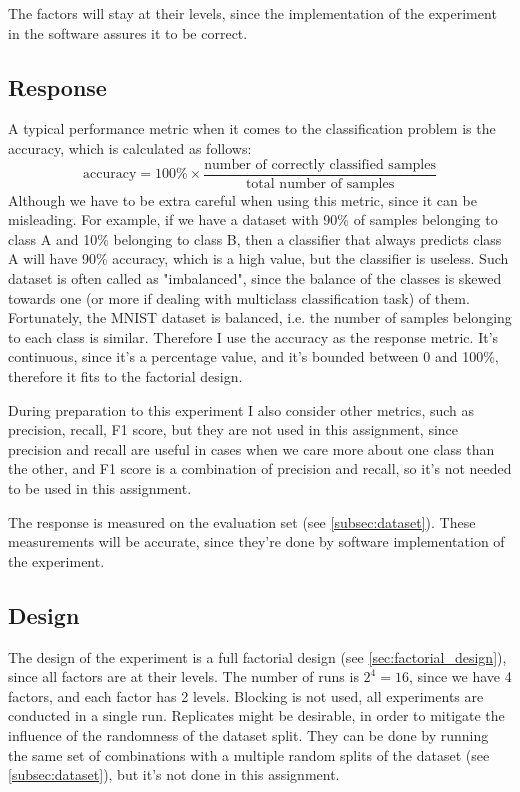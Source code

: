 \documentclass{article}
\begin{document}
The factors will stay at their levels, since the implementation of the experiment in the software assures it to be correct.

\subsection{Response}
A typical performance metric when it comes to the classification problem is the accuracy, which is calculated as follows:
\begin{equation}
    \text{accuracy} = 100\%\times\frac{\text{number of correctly classified samples}}{\text{total number of samples}}
\end{equation}
Although we have to be extra careful when using this metric, since it can be misleading. For example, if we have a dataset with 90\% of samples belonging to class A and 10\% belonging to class B, then a classifier that always predicts class A will have 90\% accuracy, which is a high value, but the classifier is useless. Such dataset is often called as "imbalanced", since the balance of the classes is skewed towards one (or more if dealing with multiclass classification task) of them. Fortunately, the MNIST dataset is balanced, i.e. the number of samples belonging to each class is similar. Therefore I use the accuracy as the response metric. It's continuous, since it's a percentage value, and it's bounded between 0 and 100\%, therefore it fits to the factorial design.

During preparation to this experiment I also consider other metrics, such as precision, recall, F1 score, but they are not used in this assignment, since precision and recall are useful in cases when we care more about one class than the other, and F1 score is a combination of precision and recall, so it's not needed to be used in this assignment.

The response is measured on the evaluation set (see \ref{subsec:dataset}). These measurements will be accurate, since they're done by software implementation of the experiment.

\subsection{Design}
The design of the experiment is a full factorial design (see \ref{sec:factorial_design}), since all factors are at their levels. The number of runs is $2^4 = 16$, since we have 4 factors, and each factor has 2 levels. Blocking is not used, all experiments are conducted in a single run. Replicates might be desirable, in order to mitigate the influence of the randomness of the dataset split. They can be done by running the same set of combinations with a multiple random splits of the dataset (see \ref{subsec:dataset}), but it's not done in this assignment.
\end{document}
